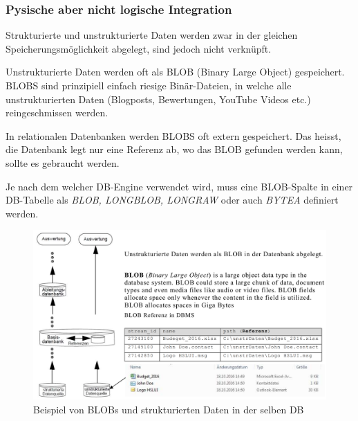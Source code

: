 \documentclass[a4paper, 11pt]{article}
\begin{document}
\subsubsection{Pysische aber nicht logische Integration}
Strukturierte und unstrukturierte Daten werden zwar in der gleichen Speicherungsmöglichkeit abgelegt, sind jedoch nicht verknüpft.

Unstrukturierte Daten werden oft als BLOB (Binary Large Object) gespeichert. BLOBS sind prinzipiell einfach riesige Binär-Dateien, in welche alle unstrukturierten Daten (Blogposts, Bewertungen, YouTube Videos etc.) reingeschmissen werden.

In relationalen Datenbanken werden BLOBS oft extern gespeichert. Das heisst, die Datenbank legt nur eine Referenz ab, wo das BLOB gefunden werden kann, sollte es gebraucht werden.

Je nach dem welcher DB-Engine verwendet wird, muss eine BLOB-Spalte in einer DB-Tabelle als \textit{BLOB, LONGBLOB, LONGRAW} oder auch \textit{BYTEA} definiert werden.

\begin{figure}[htb]
	\centering
	\includegraphics[keepaspectratio=true,height=15\baselineskip]{blob}
	\caption{Beispiel von BLOBs und strukturierten Daten in der selben DB}
	\label{fig:blob}
\end{figure}

\newpage
\end{document}
